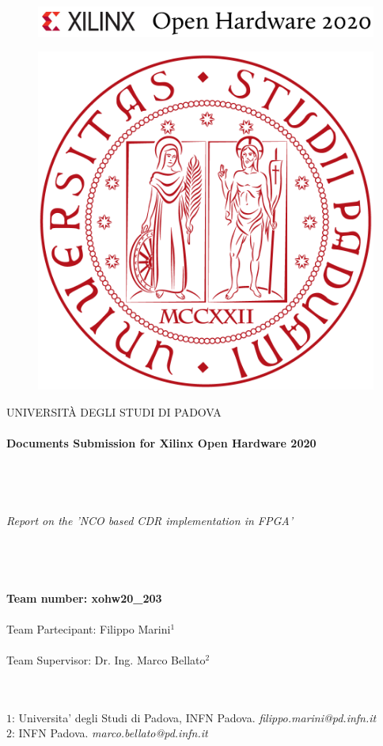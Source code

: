 \documentclass[12pt]{extarticle}
\newcommand{\<}{\langle}
\renewcommand{\>}{\rangle}
\theoremstyle{definition}
\begin{document}
\begin{figure}[]
\centering
{\includegraphics[width=1.0\textwidth]{images/xilinxoh.png}}
\end{figure}

\begin{figure}[]
\centering
{\includegraphics[width=.15\textwidth]{images/Padova.png}}
\end{figure}

\begin{center}
{\large{U}\normalsize{NIVERSITÀ DEGLI}\large{ S}\normalsize{TUDI DI}\large{ P}\normalsize{ADOVA}}\\
\textit{ }\\
\textbf{\large{Documents Submission for Xilinx Open Hardware 2020}}\\
\textit{ }\\
\textit{ }\\
\textit{ }\\
\textit{ }\\
\textit{\Large{Report on the 'NCO based CDR implementation in FPGA'}} \\
\textit{ }\\
\textit{ }\\
\textit{ }\\
\textit{ }\\
\textbf{Team number: xohw20\_203}\\
\textit{ }\\
Team Partecipant: Filippo Marini$^1$\\
\textit{ }\\
Team Supervisor: Dr. Ing. Marco Bellato$^2$\\
\textit{ }\\
\end{center}

\textit{ }\\
$1$: Universita' degli Studi di Padova, INFN Padova. \textit{filippo.marini@pd.infn.it}\\
$2$: INFN Padova. \textit{marco.bellato@pd.infn.it}\\
\newpage
\end{document}
